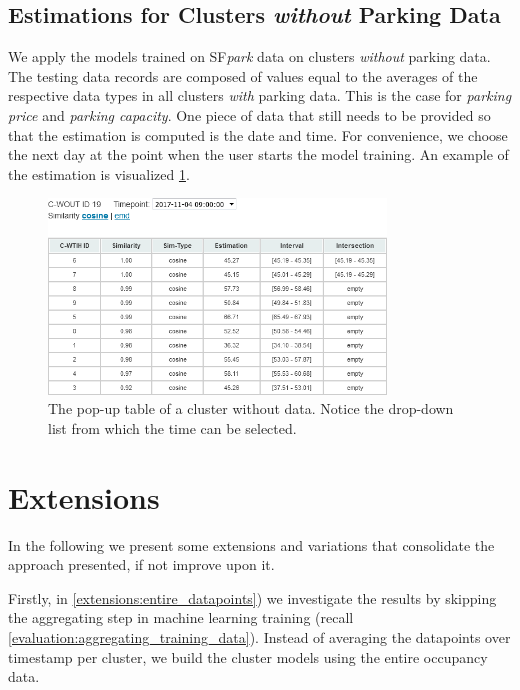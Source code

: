 \subsection{Estimations for Clusters \textit{without} Parking Data}
\label{evaluation:estimations_cwout}
We apply the models trained on SF\textit{park} data on clusters \textit{without} parking data.
The testing data records are composed of values equal to the averages of the respective data types in all clusters \textit{with} parking data.
This is the case for \textit{parking price} and \textit{parking capacity}.
One piece of data that still needs to be provided so that the estimation is computed is the date and time.
For convenience, we choose the next day at the point when the user starts the model training. 
An example of the estimation is visualized \ref{fig:cwout_table}.

\begin{figure}[!ht]
	\centering
	\includegraphics[width=0.8\textwidth]{graphics/cwout_cosine_table.png}
	\caption{The pop-up table of a cluster without data.
		Notice the drop-down list from which the time can be selected.}
	\label{fig:cwout_table}
\end{figure}

\section{Extensions}
\label{extensions}
In the following we present some extensions and variations that consolidate the approach presented, if not improve upon it. 

Firstly, in \ref{extensions:entire_datapoints}) we investigate the results by skipping the aggregating step in machine learning training (recall \ref{evaluation:aggregating_training_data}). Instead of averaging the datapoints over timestamp per cluster, we build the cluster models using the entire occupancy data.

